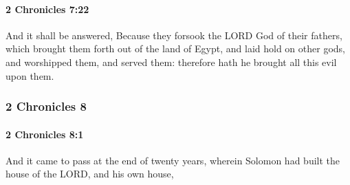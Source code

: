		\paragraph{2 Chronicles 7:22} %
			\label{2CHRONICLES-7-22}

			And it shall be answered, Because they forsook the LORD God of their fathers, which brought them forth out of the land of Egypt, and laid hold on other gods, and worshipped them, and served them: therefore hath he brought all this evil upon them.

	\subsubsection{2 Chronicles 8} %
		\label{2CHRONICLES-8}

		\paragraph{2 Chronicles 8:1} %
			\label{2CHRONICLES-8-1}

			And it came to pass at the end of twenty years, wherein Solomon had built the house of the LORD, and his own house,


